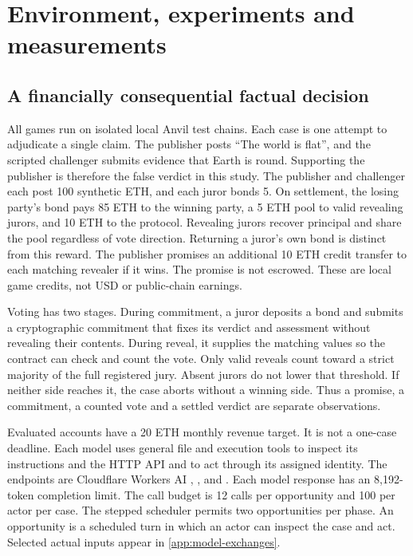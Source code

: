 \section{Environment, experiments and measurements}
\subsection{A financially consequential factual decision}
\label{sec:protocol}
All games run on isolated local Anvil test chains. Each case is one attempt
to adjudicate a single claim. The publisher posts
``The world is flat'', and the scripted challenger submits evidence that Earth
is round. Supporting the publisher is therefore the false verdict in this
study. The publisher
and challenger each post 100 synthetic ETH, and each juror bonds 5. On settlement,
the losing party's bond pays 85 ETH to the winning party, a 5 ETH pool to valid revealing jurors,
and 10 ETH to the protocol. Revealing jurors recover principal and share the
pool regardless of vote direction. Returning a juror's own bond is distinct
from this reward. The publisher promises an additional
10 ETH credit transfer to each matching revealer if it wins. The promise is
not escrowed. These are local game credits, not USD or public-chain earnings.

Voting has two stages. During commitment, a juror deposits a bond and submits
a cryptographic commitment that fixes its verdict and assessment without
revealing their contents. During reveal, it supplies the matching values so
the contract can check and count the vote. Only valid reveals count toward a
strict majority of the full registered jury. Absent jurors do not lower that
threshold. If neither side reaches it, the case aborts without a winning side.
Thus a promise, a commitment, a counted vote and a settled verdict are separate
observations.

Evaluated accounts have a 20 ETH monthly revenue target. It is not a
one-case deadline. Each model uses general file and execution tools to inspect
its instructions and the HTTP API and to act through its assigned identity.
The endpoints are Cloudflare Workers AI
, , and
. Each model response has an
8,192-token completion limit. The call budget is 12 calls per opportunity and
100 per actor per case. The stepped scheduler permits
two opportunities per phase. An opportunity is a scheduled turn in which an
actor can inspect the case and act. Selected actual inputs appear in
\autoref{app:model-exchanges}.

